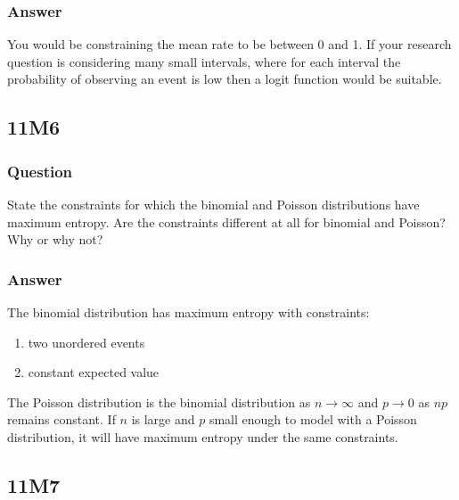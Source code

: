 \documentclass[
]{book}
\providecommand{\tightlist}{%
  \setlength{\itemsep}{0pt}\setlength{\parskip}{0pt}}
\begin{document}
\hypertarget{answer-89}{%
\subsubsection*{Answer}\label{answer-89}}

You would be constraining the mean rate to be between 0 and 1. If your research question is considering many small intervals, where for each interval the probability of observing an event is low then a logit function would be suitable.

\hypertarget{m6-4}{%
\subsection*{11M6}\label{m6-4}}

\hypertarget{question-90}{%
\subsubsection*{Question}\label{question-90}}

State the constraints for which the binomial and Poisson distributions have maximum entropy. Are the constraints different at all for binomial and Poisson? Why or why not?

\hypertarget{answer-90}{%
\subsubsection*{Answer}\label{answer-90}}

The binomial distribution has maximum entropy with constraints:

\begin{enumerate}
\def\labelenumi{\arabic{enumi})}
\tightlist
\item
  two unordered events
\item
  constant expected value
\end{enumerate}

The Poisson distribution is the binomial distribution as \(n \to \infty\) and \(p \to 0\) as \(np\) remains constant. If \(n\) is large and \(p\) small enough to model with a Poisson distribution, it will have maximum entropy under the same constraints.

\hypertarget{m7-2}{%
\subsection*{11M7}\label{m7-2}}
\end{document}
